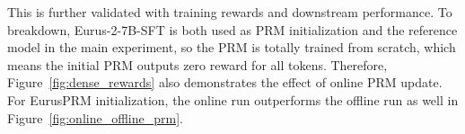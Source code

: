 This is further validated with training rewards and downstream performance. To breakdown, Eurus-2-7B-SFT is both used as PRM initialization and the reference model in the main experiment, so the PRM is totally trained from scratch, which means the initial PRM outputs zero reward for all tokens. Therefore, Figure~\ref{fig:dense_rewards} also demonstrates the effect of online PRM update. For EurusPRM initialization, the online run outperforms the offline run as well in Figure~\ref{fig:online_offline_prm}.



% 
% 






